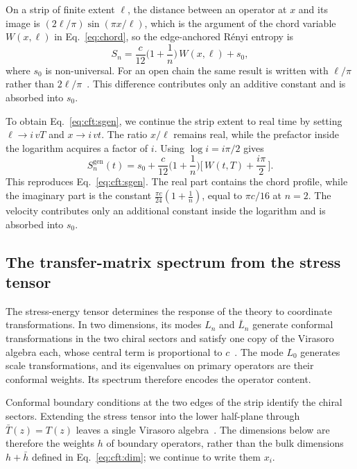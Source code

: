 On a strip of finite extent $\ell$, the distance between an operator at $x$ and its image is $(2\ell/\pi)\sin(\pi x/\ell)$, which is the argument of the chord variable $W(x,\ell)$ in Eq.~\eqref{eq:chord}, so the edge-anchored R\'enyi entropy is
\begin{equation}
  S_n = \frac{c}{12}\Big(1+\frac1n\Big)\,W(x,\ell) + s_0,
  \label{eq:cft:cc_chord}
\end{equation}
where $s_0$ is non-universal. For an open chain the same result is written with $\ell/\pi$ rather than $2\ell/\pi$~\cite{calabrese_cardy2004}. This difference contributes only an additive constant and is absorbed into $s_0$.

To obtain Eq.~\eqref{eq:cft:sgen}, we continue the strip extent to real time by setting $\ell\to i\,vT$ and $x\to i\,vt$. The ratio $x/\ell$ remains real, while the prefactor inside the logarithm acquires a factor of $i$. Using $\log i=i\pi/2$ gives
\begin{equation}
  S_n^{\mathrm{gen}}(t) = s_0 + \frac{c}{12}\Big(1+\frac1n\Big)\Big[\,W(t,T) + \frac{i\pi}{2}\,\Big].
  \label{eq:cft:sgen_derived}
\end{equation}
This reproduces Eq.~\eqref{eq:cft:sgen}. The real part contains the chord profile, while the imaginary part is the constant $\tfrac{\pi c}{24}(1+\tfrac1n)$, equal to $\pi c/16$ at $n=2$. The velocity contributes only an additional constant inside the logarithm and is absorbed into $s_0$.


\subsection{The transfer-matrix spectrum from the stress tensor}
\label{app:cft:spectrum}

The stress-energy tensor determines the response of the theory to coordinate transformations. In two dimensions, its modes $L_n$ and $\bar L_n$ generate conformal transformations in the two chiral sectors and satisfy one copy of the Virasoro algebra each, whose central term is proportional to $c$~\cite{difrancesco1997}. The mode $L_0$ generates scale transformations, and its eigenvalues on primary operators are their conformal weights. Its spectrum therefore encodes the operator content.

Conformal boundary conditions at the two edges of the strip identify the chiral sectors. Extending the stress tensor into the lower half-plane through $\bar T(z)=T(z)$ leaves a single Virasoro algebra~\cite{cardy1984}. The dimensions below are therefore the weights $h$ of boundary operators, rather than the bulk dimensions $h+\bar h$ defined in Eq.~\eqref{eq:cft:dim}; we continue to write them $x_i$.

